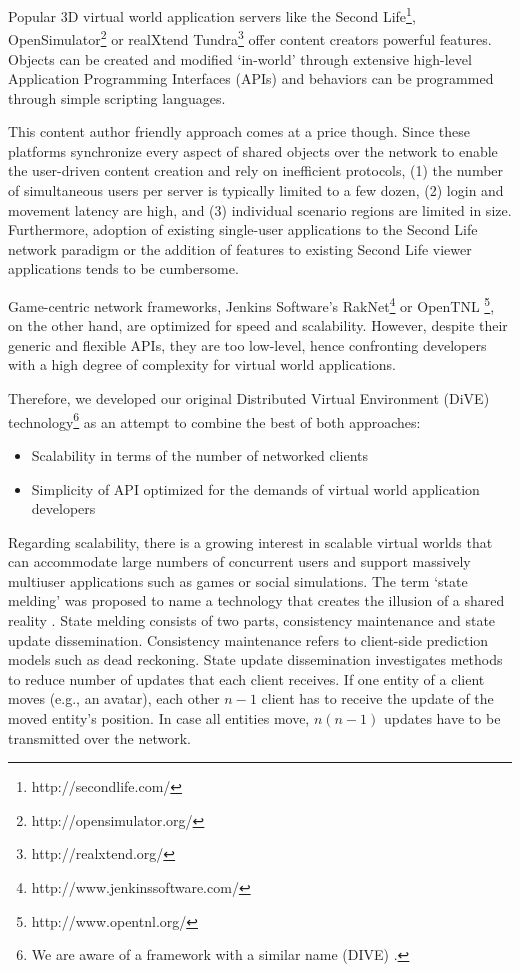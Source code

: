 \documentclass[]{elsarticle}
\begin{document}
Popular 3D virtual world application servers like the Second Life\footnote{http://secondlife.com/}, OpenSimulator\footnote{http://opensimulator.org/} or realXtend Tundra\footnote{http://realxtend.org/} offer content creators powerful features. Objects can be created and modified `in-world' through extensive high-level Application Programming Interfaces (APIs) and behaviors can be programmed through simple scripting languages.

This content author friendly approach comes at a price though. Since these platforms synchronize every aspect of shared objects over the network to enable the user-driven content creation and rely on inefficient protocols, (1) the number of simultaneous users per server is typically limited to a few dozen, (2) login and movement latency are high, and (3) individual scenario regions are limited in size. Furthermore, adoption of existing single-user applications to the Second Life network paradigm or the addition of features to existing Second Life viewer applications tends to be cumbersome.

Game-centric network frameworks, Jenkins Software's RakNet\footnote{http://www.jenkinssoftware.com/} or OpenTNL \footnote{http://www.opentnl.org/}, on the other hand, are optimized for speed and scalability. However, despite their generic and flexible APIs, they are too low-level, hence confronting developers with a high degree of complexity for virtual world applications.

Therefore, we developed our original Distributed Virtual Environment (DiVE) technology\footnote{We are aware of a framework with a similar name (DIVE) \cite{Frecon+Stenius.1998}.} as an attempt to combine the best of both approaches:
\begin{itemize}
\item Scalability in terms of the number of networked clients
\item Simplicity of API optimized for the demands of virtual world application developers
\end{itemize}
Regarding scalability, there is a growing interest in scalable virtual worlds that can accommodate large numbers of concurrent users and support massively multiuser applications such as games or social simulations. The term `state melding' was proposed to name a technology that creates the illusion of a shared reality \cite{Liu+others.2012}. State melding consists of two parts, consistency maintenance and state update dissemination. Consistency maintenance refers to client-side prediction models such as dead reckoning. State update dissemination investigates methods to reduce number of updates that each client receives. If one entity of a client moves (e.g., an avatar), each other $n-1$ client has to receive the update of the moved entity's position. In case all entities move, $n(n-1)$ updates have to be transmitted over the network.
\end{document}
